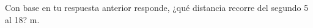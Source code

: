 Con base en tu respuesta anterior responde, ¿qué distancia recorre del segundo 5 al 18? \fillin[97.5][0.5cm] m.